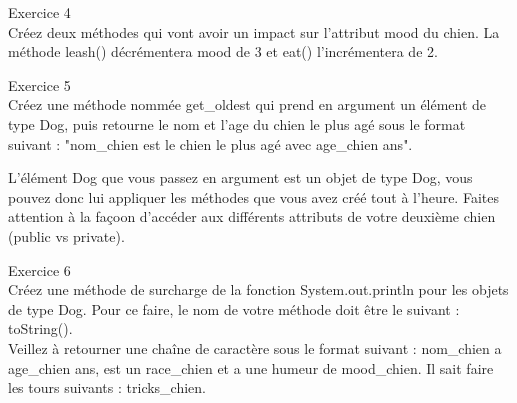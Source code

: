 \begin{Exercice}[5 minutes] Exercice 4\\
    Créez deux méthodes qui vont avoir un impact sur l'attribut mood du chien. La méthode leash() décrémentera mood de 3 et eat() l'incrémentera de 2. \\

\begin{solution}
	
\end{solution}
\end{Exercice}

\begin{Exercice}[5 minutes] Exercice 5\\
    Créez une méthode nommée get\_oldest qui prend en argument un élément de type Dog, puis retourne le nom et l'age du chien le plus agé sous le format suivant : "nom\_chien est le chien le plus agé avec age\_chien ans". \\
   	
\begin{conseil}
   L'élément Dog que vous passez en argument est un objet de type Dog, vous pouvez donc lui appliquer les méthodes que vous avez créé tout à l'heure.
   Faites attention à la façoon d'accéder aux différents attributs de votre deuxième chien (public vs private).
\end{conseil}
    
\begin{solution}
	
\end{solution}
\end{Exercice}

\begin{Exercice}[5 minutes] Exercice 6\\
    Créez une méthode de surcharge de la fonction System.out.println pour les objets de type Dog. Pour ce faire, le nom de votre méthode doit être le suivant : toString(). \\
    Veillez à retourner une chaîne de caractère sous le format suivant : nom\_chien a age\_chien ans, est un race\_chien et a une humeur de mood\_chien. Il sait faire les tours suivants : tricks\_chien.


\begin{solution}
	
\end{solution}
\end{Exercice}

